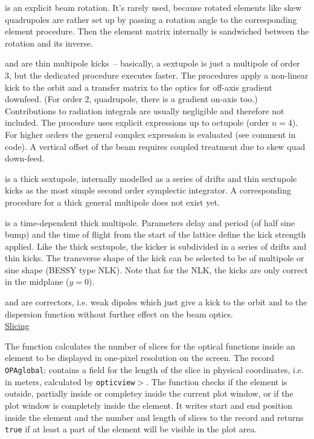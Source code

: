 \documentclass[12pt]{article}
\newcommand\code[1]{{\tt #1}}
\newcommand{\unico}[1]{{\color{burntorange}\code{#1}}}
\newcommand{\prcod}[2]{\opauni{#1}$>$\unico{#2}}
\newcommand{\vrcod}[2]{\opauni{#1}:\unico{#2}}
\newcommand{\opauni}[1]{\colorbox{orange!30}{\code{#1}}}
\begin{document}
\unico{Rotation} is an explicit beam rotation. It's rarely used, because rotated elements like skew quadrupoles are rather set up by passing a rotation angle to the corresponding element procedure. Then the element matrix internally is sandwiched between the rotation and its inverse.

\unico{ThinSextupole} and \unico{Multipole} are thin multipole kicks~-- basically, a sextupole is just a multipole of order 3, but the dedicated procedure executes faster. The procedures apply a non-linear kick to the orbit and a transfer matrix to the optics for off-axis gradient downfeed. (For order 2, quadrupole, there is a gradient on-axis too.) Contributions to radiation integrals are usually negligible and therefore not included. The \unico{Multipole} procedure uses explicit expressions up to octupole (order $n=4$). For higher orders the general complex expression is evaluated (see comment in code). A vertical offset of the beam requires coupled treatment due to skew quad down-feed.

\unico{Sextupole} is a thick sextupole, internally modelled as a series of drifts and thin sextupole kicks as the most simple second order symplectic integrator. A corresponding procedure for a thick general multipole does not exist yet.

\unico{Kicker} is a time-dependent thick multipole. Parameters delay and period (of half sine bump) and the time of flight from the start of the lattice define the kick strength applied. Like the thick sextupole, the kicker is subdivided in a series of drifts and thin kicks. The transverse shape of the kick can be selected to be of multipole or  sine shape (BESSY type NLK). Note that for the NLK, the kicks are only correct in the midplane ($y=0$).

\unico{HCorr} and \unico{VCorr} are correctors, i.e. weak dipoles which just give a kick to the orbit and to the dispersion function without further effect on the beam optics.\\

\underline{Slicing}

The \unico{SliceSet} function calculates the number of slices for the optical functions inside an element to be displayed in one-pixel resolution on the screen. The record \vrcod{OPAglobal}{CurvePlot} contains a field \unico{slice} for the length of the slice in physical coordinates, i.e. in meters, calculated by \prcod{opticview}{Zoom}. The \unico{SliceSet} function checks if the element is outside, partially inside or completey inside the current plot window, or if the plot window is completely inside the element. It writes start and end position inside the element and the number and length of slices to the \unico{CurvePlot} record and returns \code{true} if at least a part of the element will be visible in the plot area.
\end{document}
